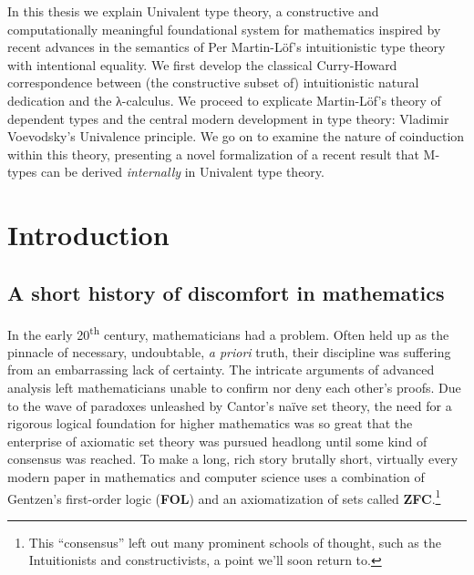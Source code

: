 \documentclass[12pt,twoside]{reedthesis}
\makeatletter
\let\oldindex\index
\renewcommand{\index}[1]
               {\oldindex{#1}\marginpar{\footnotesize\color{index}index: #1}}
\newcommand{\indeX}{\oldindex}
\newcommand{\indeX}{\index}
\newcommand{\abbreviation}[1]{\textbf{#1}\indeX{#1@\textbf{#1}}} %
\makeatother
\begin{document}
In this thesis we explain Univalent type theory, a constructive and
computationally meaningful foundational system for mathematics inspired by
recent advances in the semantics of Per Martin-L\"of's intuitionistic type
theory with intentional equality. We first develop the classical Curry-Howard
correspondence between (the constructive subset of) intuitionistic natural
dedication and the λ-calculus. We proceed to explicate Martin-L\"of's theory of
dependent types and the central modern development in type theory: Vladimir
Voevodsky's Univalence principle. We go on to examine the nature of coinduction
within this theory, presenting a novel formalization of a recent result that
M-types can be derived \textit{internally} in Univalent type theory.


\mainmatter %
\pagestyle{fancyplain} %

\chapter*{Introduction}

\section*{A short history of discomfort in mathematics}


In the early 20\textsuperscript{th} century, mathematicians had a problem. Often
held up as the pinnacle of necessary, undoubtable, \textit{a priori} truth,
their discipline was suffering from an embarrassing lack of certainty. The
intricate arguments of advanced analysis left mathematicians unable to confirm
nor deny each other's proofs. Due to the wave of paradoxes unleashed by
Cantor's na\"ive set theory, the need for a rigorous logical foundation for higher
mathematics was so great that the enterprise of axiomatic set theory was pursued
headlong until some kind of consensus was reached. To make a long, rich story
brutally short, virtually every modern paper in mathematics and computer
science uses a combination of Gentzen's first-order logic (\abbreviation{FOL})
and an axiomatization of sets called
\abbreviation{ZFC}.\footnote{This ``consensus'' left out many
  prominent schools of thought, such as the Intuitionists and constructivists, a
  point we'll soon return to.}
\end{document}
